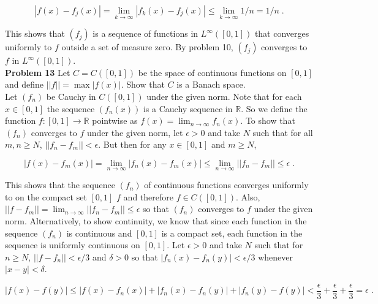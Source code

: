 \documentclass[a4paper]{article}
\begin{document}
$$|f(x) - f_j(x)|  = \lim_{k\rightarrow \infty} |f_k(x) - f_j(x)| \leq \lim_{k\rightarrow \infty} 1/n = 1/n \;.$$

This shows that $(f_j)$ is a sequence of functions in $L^\infty([0,1])$ that converges uniformly to $f$ outside a set of measure zero. By problem 10, $(f_j)$ converges to $f$ in $L^\infty([0,1])$.\\

{\bf Problem 13} Let $C = C([0,1])$ be the space of continuous functions on $[0,1]$ and define $||f|| = \max |f(x)|$. Show that $C$ is a Banach space. \\

Let $(f_n)$ be Cauchy in $C([0,1])$ under the given norm. Note that for each $x \in [0,1]$ the sequence $(f_n(x))$ is a Cauchy sequence in $\mathbb{R}$. So we define the function $f : [0,1] \rightarrow \mathbb{R}$ pointwise as $f(x) = \lim_{n\rightarrow \infty} f_n(x)$. To show that $(f_n)$ converges to $f$ under the given norm, let $\epsilon > 0$ and take $N$ such that for all $m,n \geq N$, $||f_n - f_m|| < \epsilon$. But then for any $x \in [0,1]$ and $m \geq N$,

$$|f(x) - f_m(x)| = \lim_{n\rightarrow \infty} |f_n(x) - f_m(x)| \leq \lim_{n\rightarrow \infty} ||f_n - f_m|| \leq \epsilon \;.$$

This shows that the sequence $(f_n)$ of continuous functions  converges uniformly to on the compact set $[0,1]$ $f$ and therefore $f \in C([0,1])$. Also, $||f - f_m|| = \lim_{n\rightarrow \infty } ||f_n - f_m|| \leq \epsilon$ so that $(f_n)$ converges to $f$ under the given norm. Alternatively, to show continuity, we know that since each function in the sequence $(f_n)$ is continuous and $[0,1]$ is a compact set, each function in the sequence is uniformly continuous on $[0,1]$. Let $\epsilon >0 $ and take $N$ such that for $n \geq N$, $||f-f_n|| < \epsilon/3$ and $\delta > 0$ so that $|f_n(x) - f_n(y)| < \epsilon /3$ whenever $|x - y| < \delta$. 

$$|f(x) - f(y)| \leq |f(x) - f_n(x)| + |f_n(x) - f_n(y)| + |f_n(y) - f(y)| < \frac{\epsilon}{3} + \frac{\epsilon}{3} + \frac{\epsilon}{3} = \epsilon \;.$$
\end{document}
